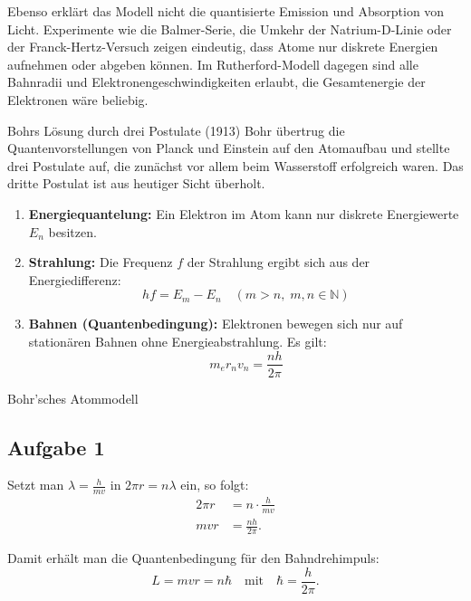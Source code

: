 \documentclass[11pt,a4paper,oneside]{article}
\begin{document}
	Ebenso erklärt das Modell nicht die quantisierte Emission und Absorption 
	von Licht. Experimente wie die Balmer-Serie, die Umkehr der Natrium-D-Linie 
	oder der Franck-Hertz-Versuch zeigen eindeutig, dass Atome nur diskrete 
	Energien aufnehmen oder abgeben können. Im Rutherford-Modell dagegen 
	sind alle Bahnradii und Elektronengeschwindigkeiten erlaubt, 
	die Gesamtenergie der Elektronen wäre beliebig.
	
	\begin{theo}{Bohrs Lösung durch drei Postulate (1913)}
		Bohr übertrug die Quantenvorstellungen von Planck und Einstein 
		auf den Atomaufbau und stellte drei Postulate auf, 
		die zunächst vor allem beim Wasserstoff erfolgreich waren. 
		Das dritte Postulat ist aus heutiger Sicht überholt.
		
		\begin{enumerate}
			\item \textbf{Energiequantelung:} 
			Ein Elektron im Atom kann nur diskrete Energiewerte $E_n$ besitzen.
			
			\item \textbf{Strahlung:} 
			Die Frequenz $f$ der Strahlung ergibt sich aus der Energiedifferenz:
			\[
			h f = E_m - E_n \quad (m > n, \; m,n \in \mathbb{N})
			\]
			
			\item \textbf{Bahnen (Quantenbedingung):} 
			Elektronen bewegen sich nur auf stationären Bahnen ohne Energieabstrahlung. 
			Es gilt:
			\[
			m_e r_n v_n = \frac{n h}{2 \pi}
			\]
		\end{enumerate}
	\end{theo}
	
	\begin{loesung}{Bohr'sches Atommodell}
		\subsection*{Aufgabe 1}		
		Setzt man $\lambda = \tfrac{h}{mv}$ in $2 \pi r = n \lambda$ ein, so folgt:
		\begin{align*}
			2 \pi r &= n \cdot \frac{h}{m v} \\
			m v r &= \frac{n h}{2 \pi}.
		\end{align*}
		
		Damit erhält man die Quantenbedingung für den Bahndrehimpuls:
		\[
		L = m v r = n \hbar \quad \text{mit} \quad \hbar = \frac{h}{2 \pi}.
		\]
	\end{loesung}
	
	
	
\end{document}
